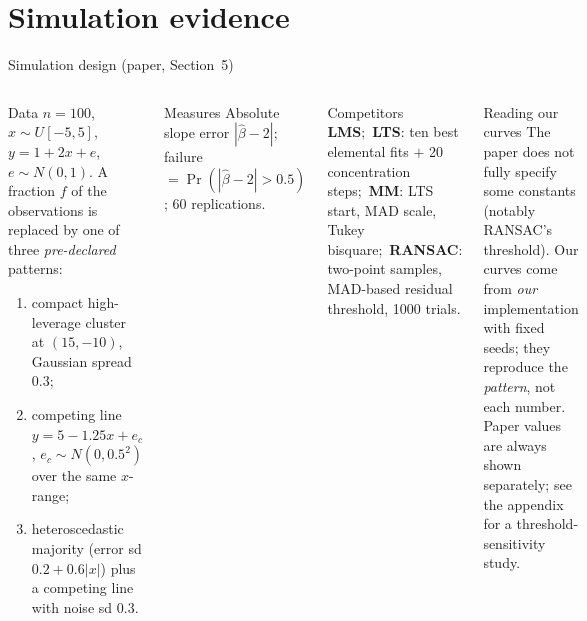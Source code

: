 \documentclass[aspectratio=169,9pt]{beamer}
\begin{document}
\section{Simulation evidence}
\begin{frame}{Simulation design (paper, Section~5)}
\begin{columns}[T]
\begin{rdef}{Data}{}{}
$n=100$, $x\sim U[-5,5]$, $y=1+2x+e$, $e\sim N(0,1)$. A fraction $f$ of the observations is replaced by one of three \emph{pre-declared} patterns:
\begin{enumerate}\setlength\itemsep{1pt}
\item compact high-leverage cluster at $(15,-10)$, Gaussian spread $0.3$;
\item competing line $y=5-1.25x+e_c$, $e_c\sim N(0,0.5^2)$ over the same $x$-range;
\item heteroscedastic majority (error sd $0.2+0.6|x|$) plus a competing line with noise sd $0.3$.
\end{enumerate}
\end{rdef}
\begin{rdef}{Measures}{}{}
Absolute slope error $|\hat\beta-2|$; failure $=\Pr(|\hat\beta-2|>0.5)$; 60 replications.
\end{rdef}
\begin{rdef}{Competitors}{}{}
\textbf{LMS};\ \textbf{LTS}: ten best elemental fits $+$ 20 concentration steps;\ \textbf{MM}: LTS start, MAD scale, Tukey bisquare;\ \textbf{RANSAC}: two-point samples, MAD-based residual threshold, 1000 trials.
\end{rdef}
\begin{rwarn}{Reading our curves}
The paper does not fully specify some constants (notably RANSAC's threshold). Our curves come from \emph{our} implementation with fixed seeds; they reproduce the \emph{pattern}, not each number. Paper values are always shown separately; see the appendix for a threshold-sensitivity study.
\end{rwarn}
\end{columns}
\end{frame}
\end{document}
